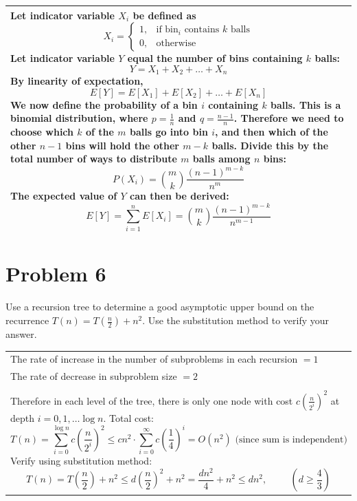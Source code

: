 \documentclass[10pt]{article}
\newenvironment{answer}
    {\begin{center}
    \begin{tabular}{|p{1\textwidth}|}
    \hline
    }
    { 
    \\\hline
    \end{tabular} 
    \end{center}
    }
\begin{document}
\begin{answer}
  Let indicator variable $X_i$ be defined as
  \begin{equation*} 
    X_i =
    \begin{cases*}
      1, & \textrm{if $\text{bin}_i$ contains $k$ balls} \\
      0, & \textrm{otherwise}
    \end{cases*}
  \end{equation*}
  Let indicator variable $Y$ equal the number of bins containing $k$ balls:
  \[ Y = X_1 + X_2 + \ldots + X_n \]
  By linearity of expectation,
  \[ E[Y] = E[X_1] + E[X_2] + \ldots + E[X_n] \]
  We now define the probability of a bin $i$ containing $k$ balls. This is a binomial distribution, where $p = \frac{1}{n}$ and $q = \frac{n-1}{n}$. Therefore we need to choose which $k$ of the $m$ balls go into bin $i$, and then which of the other $n-1$ bins will hold the other $m-k$ balls. Divide this by the total number of ways to distribute $m$ balls among $n$ bins:
  \[ P(X_i) = \binom{m}{k}\frac{(n-1)^{m-k}}{n^m} \]
  The expected value of $Y$ can then be derived:
  \[ E[Y] = \sum_{i=1}^nE[X_i] = \binom{m}{k}\frac{(n-1)^{m-k}}{n^{m-1}}\]
\end{answer}

\section*{Problem 6}
Use a recursion tree to determine a good asymptotic upper bound on the recurrence
$T(n) = T(\frac{n}{2}) + n^2$. Use the substitution method to verify your answer.

\begin{answer}
  The rate of increase in the number of subproblems in each recursion $= 1$ \\
  The rate of decrease in subproblem size $= 2$ \\ \\ 
  Therefore in each level of the tree, there is only one node with cost $c\left(\frac{n}{2^i}\right)^2$ at depth $i = 0,1,\ldots \log n$. Total cost:
  \[ T(n) = \sum_{i=0}^{\log n}c\left(\frac{n}{2^i}\right)^2 \le cn^2 \cdot \sum_{i=0}^{\infty}c\left(\frac{1}{4}\right)^i = O(n^2) \textrm{ (since sum is independent)}\]
  Verify using substitution method:
  \[ T(n) = T\left(\frac{n}{2}\right) + n^2 \le d\left(\frac{n}{2}\right)^2 + n^2 = \frac{dn^2}{4} + n^2 \le dn^2, \hspace{1cm} \left(d \ge \frac{4}{3}\right) \]
\end{answer}
\end{document}
